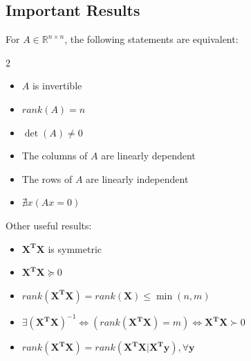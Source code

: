 \subsection{Important Results}
\begin{theorem}
  For $A\in \mathbb{R}^{n\times n}$, the following statements are equivalent:
  \begin{multicols}{2}
    \begin{itemize}
      \item $A$ is invertible
      \item $rank(A)=n$ 
      \item $\det(A)\neq 0$
      \item The columns of $A$ are linearly dependent
      \item The rows of $A$ are linearly independent
      \item $\nexists x (Ax=0)$
    \end{itemize}
  \end{multicols}
\end{theorem}
Other useful results:
\begin{itemize}
  \item $\mathbf{X^{T}X}$ is symmetric
  \item $\mathbf{X^{T}X}\succeq0$
  \item $rank(\mathbf{X^{T}X})=rank(\mathbf{X})\le \min(n,m)$ 
  \item $\exists{(\mathbf{X^{T}X})}^{-1}\iff(rank(\mathbf{X^{T}X})=m)\iff\mathbf{X^{T}X}\succ 0$
  \item $rank(\mathbf{X^{T}X})=rank(\mathbf{X^{T}X}|\mathbf{X^{T}y}), \forall \mathbf{y}$
\end{itemize}
